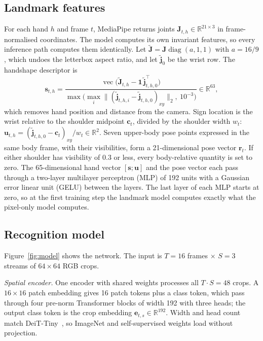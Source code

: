 \documentclass[pdflatex,sn-mathphys-num,twocolumn]{sn-jnl}
\theoremstyle{thmstyleone}%
\begin{document}
\subsection{Landmark features}\label{sec:method:lm}
For each hand $h$ and frame $t$, MediaPipe returns joints $\mathbf{J}_{t,h}\in\mathbb{R}^{21\times3}$ in frame-normalised coordinates. The model computes its own invariant features, so every inference path computes them identically. Let $\tilde{\mathbf{J}}=\mathbf{J}\operatorname{diag}(a,1,1)$ with $a=16/9$, which undoes the letterbox aspect ratio, and let $\tilde{\mathbf{j}}_{0}$ be the wrist row. The handshape descriptor is
\begin{equation}
\mathbf{s}_{t,h}=\frac{\operatorname{vec}\big(\tilde{\mathbf{J}}_{t,h}-\mathbf{1}\,\tilde{\mathbf{j}}^{\top}_{t,h,0}\big)}{\max\!\big(\max_i\lVert(\tilde{\mathbf{j}}_{t,h,i}-\tilde{\mathbf{j}}_{t,h,0})_{xy}\rVert_2,\ 10^{-3}\big)}\in\mathbb{R}^{63},\label{eq:shape}
\end{equation}
which removes hand position and distance from the camera. Sign location is the wrist relative to the shoulder midpoint $\mathbf{c}_t$, divided by the shoulder width $w_t$: $\mathbf{u}_{t,h}=(\tilde{\mathbf{j}}_{t,h,0}-\mathbf{c}_t)_{xy}/w_t\in\mathbb{R}^2$. Seven upper-body pose points expressed in the same body frame, with their visibilities, form a 21-dimensional pose vector $\mathbf{r}_t$. If either shoulder has visibility of 0.3 or less, every body-relative quantity is set to zero. The 65-dimensional hand vector $[\mathbf{s};\mathbf{u}]$ and the pose vector each pass through a two-layer multilayer perceptron (MLP) of 192 units with a Gaussian error linear unit (GELU) between the layers. The last layer of each MLP starts at zero, so at the first training step the landmark model computes exactly what the pixel-only model computes.

\subsection{Recognition model}\label{sec:method:model}
Figure~\ref{fig:model} shows the network. The input is $T=16$ frames $\times$ $S=3$ streams of $64\times64$ RGB crops.

\textit{Spatial encoder.} One encoder with shared weights processes all $T\cdot S=48$ crops. A $16\times16$ patch embedding gives 16 patch tokens plus a class token, which pass through four pre-norm Transformer blocks of width 192 with three heads; the output class token is the crop embedding $\mathbf{e}_{t,s}\in\mathbb{R}^{192}$. Width and head count match DeiT-Tiny~\cite{touvron2021deit}, so ImageNet and self-supervised weights load without projection.
\end{document}
